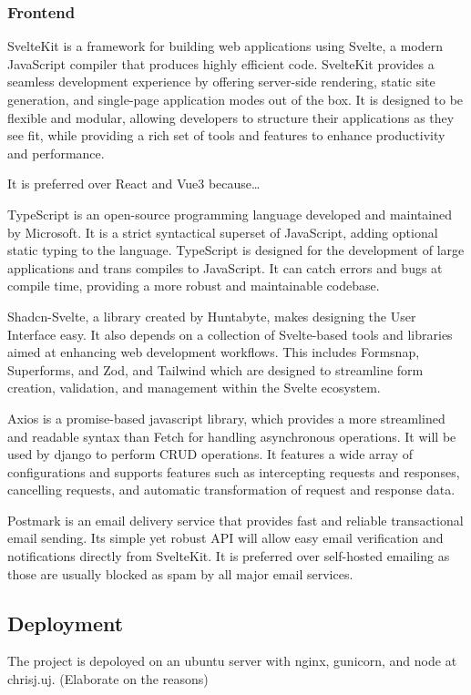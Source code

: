 \begin{multicols}{2}
\subsubsection{Frontend}
SvelteKit is a framework for building web applications using Svelte, a modern JavaScript compiler that produces highly efficient code. SvelteKit provides a seamless development experience by offering server-side rendering, static site generation, and single-page application modes out of the box. It is designed to be flexible and modular, allowing developers to structure their applications as they see fit, while providing a rich set of tools and features to enhance productivity and performance.

It is preferred over React and Vue3 because…

TypeScript is an open-source programming language developed and maintained by Microsoft. It is a strict syntactical superset of JavaScript, adding optional static typing to the language. TypeScript is designed for the development of large applications and trans compiles to JavaScript. It can catch errors and bugs at compile time, providing a more robust and maintainable codebase.

Shadcn-Svelte, a library created by Huntabyte, makes designing the User Interface easy. It also depends on a collection of Svelte-based tools and libraries aimed at enhancing web development workflows. This includes Formsnap, Superforms, and Zod, and Tailwind which are designed to streamline form creation, validation, and management within the Svelte ecosystem. 

Axios is a promise-based javascript library, which provides a more streamlined and readable syntax than Fetch for handling asynchronous operations. It will be used by django to perform CRUD operations. It features a wide array of configurations and supports features such as intercepting requests and responses, cancelling requests, and automatic transformation of request and response data.

Postmark is an email delivery service that provides fast and reliable transactional email sending. Its simple yet robust API will allow easy email verification and notifications directly from SvelteKit. It is preferred over self-hosted emailing as those are usually blocked as spam by all major email services.

\subsection{Deployment}
The project is depoloyed on an ubuntu server with nginx, gunicorn, and node at chrisj.uj. (Elaborate on the reasons)

\end{multicols}